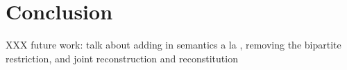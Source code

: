 \documentclass[11pt,a4paper]{article}
\begin{document}

\section{Conclusion}

XXX future work: talk about adding in semantics a la , removing the
bipartite restriction, and joint reconstruction and reconstitution
\clearpage


\end{document}
